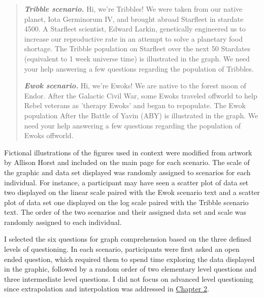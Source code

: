 \documentclass[print]{nuthesis}
\begin{document}
\begin{quote}
\textbf{\textit{Tribble scenario.}} Hi, we're Tribbles! We were taken from our native planet, Iota Germinorum IV, and brought abroad Starfleet in stardate 4500. A Starfleet scientist, Edward Larkin, genetically engineered us to increase our reproductive rate in an attempt to solve a planetary food shortage. The Tribble population on Starfleet over the next 50 Stardates (equivalent to 1 week universe time) is illustrated in the graph. We need your help answering a few questions regarding the population of Tribbles.

\textbf{\textit{Ewok scenario.}} Hi, we're Ewoks! We are native to the forest moon of Endor. After the Galactic Civil War, some Ewoks traveled offworld to help Rebel veterans as 'therapy Ewoks' and began to repopulate. The Ewok population After the Battle of Yavin (ABY) is illustrated in the graph. We need your help answering a few questions regarding the population of Ewoks offworld.
\end{quote}

Fictional illustrations of the figures used in context were modified from artwork by Allison Horst and included on the main page for each scenario.
The scale of the graphic and data set displayed was randomly assigned to scenarios for each individual.
For instance, a participant may have seen a scatter plot of data set two displayed on the linear scale paired with the Ewok scenario text and a scatter plot of data set one displayed on the log scale paired with the Tribble scenario text.
The order of the two scenarios and their assigned data set and scale was randomly assigned to each individual.

I selected the six questions  for graph comprehension based on the three defined levels of questioning.
In each scenario, participants were first asked an open ended question, which required them to spend time exploring the data displayed in the graphic, followed by a random order of two elementary level questions and three intermediate level questions.
I did not focus on advanced level questioning since extrapolation and interpolation was addressed in \protect\hyperlink{youdrawit}{Chapter 2}.
\end{document}
